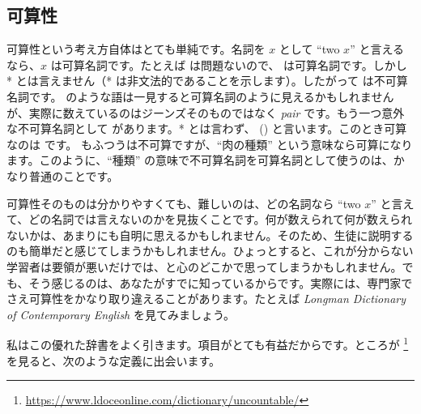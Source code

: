 \subsection{可算性}\label{sec:count}

可算性という考え方自体はとても単純です。名詞を $x$ として \enquote{two $x$} と言えるなら、$x$ は可算名詞です。たとえば  は問題ないので、 は可算名詞です。しかし * とは言えません（* は非文法的であることを示します）。したがって  は不可算名詞です。 のような語は一見すると可算名詞のように見えるかもしれませんが、実際に数えているのはジーンズそのものではなく \emph{pair} です。もう一つ意外な不可算名詞として  があります。*  とは言わず、 ()  と言います。このとき可算なのは  です。 もふつうは不可算ですが、\enquote{肉の種類} という意味なら可算になります。このように、\enquote{種類} の意味で不可算名詞を可算名詞として使うのは、かなり普通のことです。

可算性そのものは分かりやすくても、難しいのは、どの名詞なら \enquote{two $x$} と言えて、どの名詞では言えないのかを見抜くことです。何が数えられて何が数えられないかは、あまりにも自明に思えるかもしれません。そのため、生徒に説明するのも簡単だと感じてしまうかもしれません。ひょっとすると、これが分からない学習者は要領が悪いだけでは、と心のどこかで思ってしまうかもしれません。でも、そう感じるのは、あなたがすでに知っているからです。実際には、専門家でさえ可算性をかなり取り違えることがあります。たとえば \textit{Longman Dictionary of Contemporary English} を見てみましょう。

私はこの優れた辞書をよく引きます。項目がとても有益だからです。ところが \footnote{\url{https://www.ldoceonline.com/dictionary/uncountable/}} を見ると、次のような定義に出会います。

